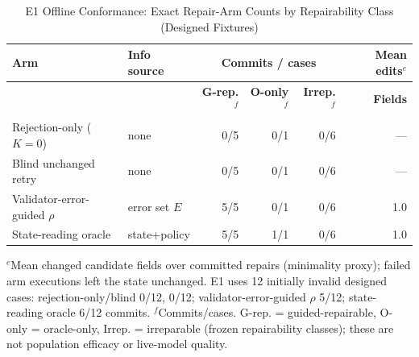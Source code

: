 \begin{table}[t]
\caption{E1 Offline Conformance: Exact Repair-Arm Counts by Repairability Class (Designed Fixtures)}
\label{tab:pilot-repair}
\centering\scriptsize
\setlength{\tabcolsep}{4pt}
\renewcommand{\arraystretch}{1.20}
\begin{tabularx}{\columnwidth}{@{}>{\raggedright\arraybackslash}X
 >{\raggedright\arraybackslash}X rrrr@{}}
\toprule
\textbf{Arm} & \textbf{Info source} & \multicolumn{3}{c}{\textbf{Commits / cases}} & \textbf{Mean edits}$^{e}$ \\
\cmidrule(lr){3-5}
 & & \textbf{G-rep.}$^{f}$ & \textbf{O-only}$^{f}$ & \textbf{Irrep.}$^{f}$ & \textbf{Fields} \\
\midrule
Rejection-only ($K{=}0$) & none & 0/5 & 0/1 & 0/6 & --- \\
Blind unchanged retry & none & 0/5 & 0/1 & 0/6 & --- \\
\addlinespace[2pt]
Validator-error-guided $\rho$ & error set $E$ & 5/5 & 0/1 & 0/6 & 1.0 \\
State-reading oracle & state+policy & 5/5 & 1/1 & 0/6 & 1.0 \\
\bottomrule
\end{tabularx}
\par\vspace{3pt}\noindent\parbox{0.96\columnwidth}{\scriptsize $^{e}$Mean changed candidate fields over committed repairs (minimality proxy); failed arm executions left the state unchanged. E1 uses 12 initially invalid designed cases: rejection-only/blind 0/12, 0/12; validator-error-guided $\rho$ 5/12; state-reading oracle 6/12 commits. $^{f}$Commits/cases. G-rep. = guided-repairable, O-only = oracle-only, Irrep. = irreparable (frozen repairability classes); these are not population efficacy or live-model quality.}
\end{table}

